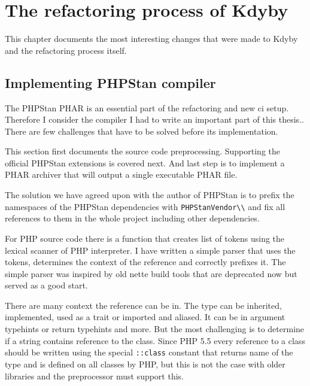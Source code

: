 \chapter{The refactoring process of Kdyby}

This chapter documents the most interesting changes that were made to Kdyby and the refactoring process itself.

\section{Implementing PHPStan compiler}

The PHPStan PHAR is an essential part of the refactoring and new \gls{ci} setup. Therefore I consider the compiler I had to write an important part of this thesis.. There are few challenges that have to be solved before its implementation.

This section first documents the source code preprocessing. Supporting the official PHPStan extensions is covered next. And last step is to implement a PHAR archiver that will output a single executable PHAR file.

 \label{sec:refactoring:phpstan-preprocessor}

The solution we have agreed upon with the author of PHPStan is to prefix the namespaces of the PHPStan dependencies with \lstinline{PHPStanVendor\\} and fix all references to them in the whole project including other dependencies.

For PHP source code there is a function  that creates list of tokens using the lexical scanner of PHP interpreter. I have written a simple parser that uses the tokens, determines the context of the reference and correctly prefixes it. The simple parser was inspired by old \gls{nette} build tools that are deprecated now but served as a good start.

There are many context the reference can be in. The type can be inherited, implemented, used as a trait or imported and aliased. It can be in argument typehints or return typehints and more. But the most challenging is to determine if a string contains reference to the class. Since PHP 5.5 every reference to a class should be written using the special \lstinline{::class} constant that returns name of the type and is defined on all classes by PHP, but this is not the case with older libraries and the preprocessor must support this.

